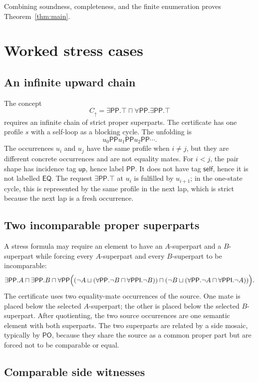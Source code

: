 \documentclass[11pt]{article}
\newcommand{\EQ}{\mathsf{EQ}}
\newcommand{\PO}{\mathsf{PO}}
\newcommand{\PP}{\mathsf{PP}}
\newcommand{\PPI}{\mathsf{PPI}}
\newcommand{\up}{\mathsf{up}}
\newcommand{\self}{\mathsf{self}}
\begin{document}
Combining soundness, completeness, and the finite enumeration proves Theorem~\ref{thm:main}.

\section{Worked stress cases}

\subsection{An infinite upward chain}

The concept
\[
  C_\uparrow=\exists\PP.\top\sqcap\forall\PP.\exists\PP.\top
\]
requires an infinite chain of strict proper superparts.  The certificate has one profile $s$ with a self-loop as a blocking cycle.  The unfolding is
\[
  u_0\PP u_1\PP u_2\PP\cdots.
\]
The occurrences $u_i$ and $u_j$ have the same profile when $i\ne j$, but they are different concrete occurrences and are not equality mates.  For $i<j$, the pair shape has incidence tag $\up$, hence label $\PP$.  It does not have tag $\self$, hence it is not labelled $\EQ$.  The request $\exists\PP.\top$ at $u_i$ is fulfilled by $u_{i+1}$; in the one-state cycle, this is represented by the same profile in the next lap, which is strict because the next lap is a fresh occurrence.

\subsection{Two incomparable proper superparts}

A stress formula may require an element to have an $A$-superpart and a $B$-superpart while forcing every $A$-superpart and every $B$-superpart to be incomparable:
\[
\exists\PP.A\sqcap\exists\PP.B\sqcap
\forall\PP\Bigl((\neg A\sqcup(\forall\PP.\neg B\sqcap\forall\PPI.\neg B))
\sqcap
(\neg B\sqcup(\forall\PP.\neg A\sqcap\forall\PPI.\neg A))\Bigr).
\]
The certificate uses two equality-mate occurrences of the source.  One mate is placed below the selected $A$-superpart; the other is placed below the selected $B$-superpart.  After quotienting, the two source occurrences are one semantic element with both superparts.  The two superparts are related by a side mosaic, typically by $\PO$, because they share the source as a common proper part but are forced not to be comparable or equal.

\subsection{Comparable side witnesses}
\end{document}
